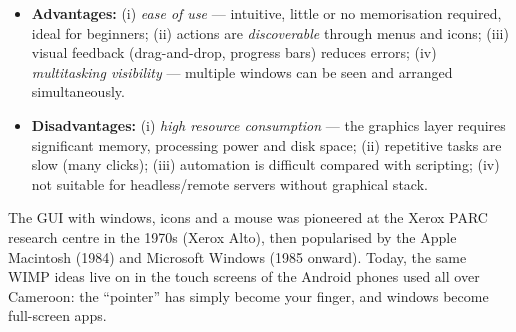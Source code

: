 \documentclass[11pt]{article}
\begin{document}
\begin{propriete}
\begin{itemize}
\item \textbf{Advantages:} (i) \emph{ease of use} --- intuitive, little or no memorisation required, ideal for beginners; (ii) actions are \emph{discoverable} through menus and icons; (iii) visual feedback (drag-and-drop, progress bars) reduces errors; (iv) \emph{multitasking visibility} --- multiple windows can be seen and arranged simultaneously.
\item \textbf{Disadvantages:} (i) \emph{high resource consumption} --- the graphics layer requires significant memory, processing power and disk space; (ii) repetitive tasks are slow (many clicks); (iii) automation is difficult compared with scripting; (iv) not suitable for headless/remote servers without graphical stack.
\end{itemize}
\end{propriete}

\begin{savaistu}
The GUI with windows, icons and a mouse was pioneered at the Xerox PARC research centre in the 1970s (Xerox Alto), then popularised by the Apple Macintosh (1984) and Microsoft Windows (1985 onward). Today, the same WIMP ideas live on in the touch screens of the Android phones used all over Cameroon: the ``pointer'' has simply become your finger, and windows become full-screen apps.
\end{savaistu}
\end{document}
